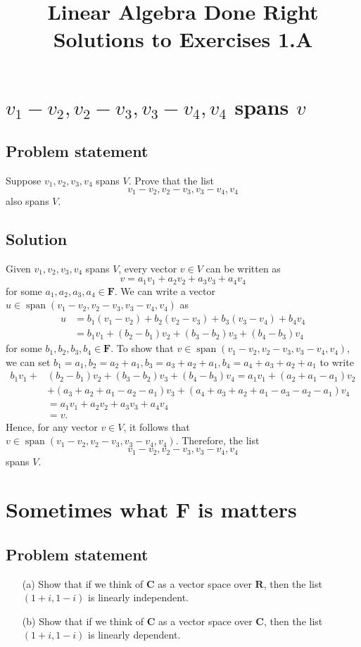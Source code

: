 \documentclass{article}
\title{Linear Algebra Done Right\\Solutions to Exercises 1.A}
\author{}
\date{}
\begin{document}
\maketitle

\section{$v_1-v_2,v_2-v_3,v_3-v_4,v_4$ spans $v$}
\subsection*{Problem statement}
Suppose $v_1,v_2,v_3,v_4$ spans $V$. 
Prove that the list
\[v_1-v_2,v_2-v_3,v_3-v_4,v_4\]
also spans $V$.

\subsection*{Solution}
Given $v_1,v_2,v_3,v_4$ spans $V$, every vector $v\in V$ can be written as 
\[v=a_1v_1+a_2v_2+a_3v_3+a_4v_4\]
for some $a_1,a_2,a_3,a_4\in\mathbf{F}$. 
We can write a vector\newline $u\in\operatorname{span}(v_1-v_2,v_2-v_3,v_3-v_4,v_4)$ as
\begin{align*}
    u&=b_1(v_1-v_2)+b_2(v_2-v_3)+b_3(v_3-v_4)+b_4v_4\\
    &=b_1v_1+(b_2-b_1)v_2+(b_3-b_2)v_3+(b_4-b_3)v_4
\end{align*}
for some $b_1,b_2,b_3,b_4\in\mathbf{F}$. 
To show that $v\in\operatorname{span}(v_1-v_2,v_2-v_3,v_3-v_4,v_4)$, we can set $b_1=a_1,b_2=a_2+a_1,b_3=a_3+a_2+a_1,b_4=a_4+a_3+a_2+a_1$ to write
\begin{align*}
    b_1v_1+&(b_2-b_1)v_2+(b_3-b_2)v_3+(b_4-b_3)v_4=a_1v_1+(a_2+a_1-a_1)v_2\\
    &+(a_3+a_2+a_1-a_2-a_1)v_3+(a_4+a_3+a_2+a_1-a_3-a_2-a_1)v_4\\
    &=a_1v_1+a_2v_2+a_3v_3+a_4v_4\\
    &=v.
\end{align*}
Hence, for any vector $v\in V$, it follows that $v\in\operatorname{span}(v_1-v_2,v_2-v_3,v_3-v_4,v_4)$. 
Therefore, the list
\[v_1-v_2,v_2-v_3,v_3-v_4,v_4\]
spans $V$. 

\clearpage

\renewcommand{\thesection}{5}
\section{Sometimes what $\mathbf{F}$ is matters}
\subsection*{Problem statement}
\begin{enumerate}
    \item[(a)] Show that if we think of $\mathbf{C}$ as a vector space over $\mathbf{R}$, then the list $(1+i,1-i)$ is linearly independent.
    \item[(b)] Show that if we think of $\mathbf{C}$ as a vector space over $\mathbf{C}$, then the list $(1+i,1-i)$ is linearly dependent.
\end{enumerate}
\end{document}
